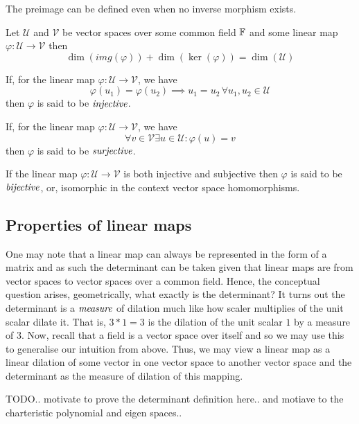 \begin{rem}
	The preimage can be defined even when no inverse morphism exists.
\end{rem}

\begin{thm}
	Let $\mathcal{U}$ and $\mathcal{V}$ be vector spaces over some common field $\mathbb{F}$
	and some linear map $\varphi : \mathcal{U} \to \mathcal{V}$ then
	\[
		\dim( img(\varphi) ) + \dim( \ker(\varphi) ) = \dim( \mathcal{U} )
	\]
\end{thm}

\begin{defn}[Injective]
	If, for the linear map $\varphi : \mathcal{U} \to \mathcal{V}$, we have
	\[
		\varphi(u_1) = \varphi(u_2) \implies u_1 = u_2 \, \forall u_1,u_2 \in \mathcal{U}
	\]
	then $\varphi$ is said to be $\emph{injective}$.
\end{defn}

\begin{defn}[Surjective]
	If, for the linear map $\varphi : \mathcal{U} \to \mathcal{V}$, we have
	\[
		\forall v \in \mathcal{V} \exists u \in \mathcal{U} : \varphi(u) = v
	\]
	then $\varphi$ is said to be $\emph{surjective}$.
\end{defn}

\begin{defn}[Bijective]
	If the linear map $\varphi : \mathcal{U} \to \mathcal{V}$ is both
	injective and subjective then $\varphi$ is said to be $\emph{bijective}$, or,
	isomorphic in the context vector space homomorphisms.
\end{defn}

\subsection{Properties of linear maps}
One may note that a linear map can always be represented in the form of a matrix and as such
the determinant can be taken given that linear maps are from vector spaces to vector spaces
over a common field.
Hence, the conceptual question arises, geometrically, what exactly is the determinant? It
turns out the determinant is a $\emph{measure}$ of dilation much like how scaler multiplies
of the unit scalar dilate it. That is, $3*1=3$ is the dilation of the unit scalar $1$ by a
measure of $3$. Now, recall that a field is a vector space over itself and so we may use this
to generalise our intuition from above. Thus, we may view a linear map as a linear dilation
of some vector in one vector space to another vector space and the determinant as the measure
of dilation of this mapping.

TODO.. motivate to prove the determinant definition here.. and motiave to the charteristic polynomial
and eigen spaces..
